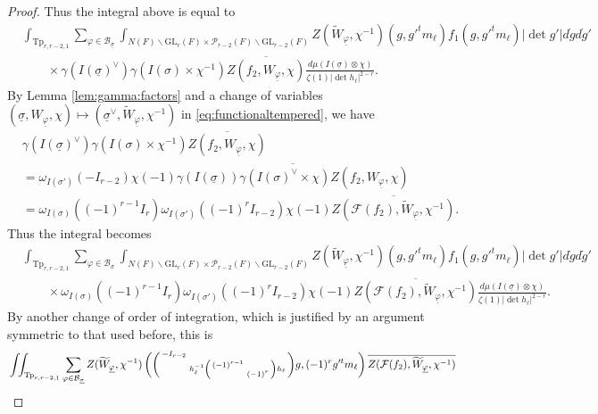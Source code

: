 \documentclass[12pt]{amsart}
\theoremstyle{remark}
\numberwithin{equation}{section}
\newcommand{\GL}{\mathrm{GL}}
\theoremstyle{definition}
\newenvironment{psmatrix}
  {\left(\begin{smallmatrix}}
  {\end{smallmatrix}\right)}
\numberwithin{equation}{subsection}
\begin{document}
\begin{proof}
Thus the integral above is equal to 
\begin{align*}
    &\int_{\mathrm{Tp}_{r,r-2,1}} \sum_{\varphi \in \mathcal{B}_{\underline{\sigma}}}\int_{N(F)\backslash\GL_r(F)\times \mathcal{P}_{r-2}(F)\backslash \GL_{r-2}(F)}Z(\widetilde{W}_{\underline{\varphi}},\chi^{-1})(g,g'^tm_{\ell})f_1(g,g'^tm_{\ell})|\det g'|d\dot{g}d\dot{g}'\\& \quad\quad\times \gamma(I(\underline{\sigma})^\vee)\gamma(I(\sigma) \times \chi^{-1})\overline{Z(f_2,W_{\underline{\varphi}},\chi)}\frac{d\mu(I(\underline{\sigma})\otimes\chi)}{\zeta(1)|\det h_\ell|^{2-r}}.
\end{align*}
By Lemma \ref{lem:gamma:factors} and a change of variables $(\underline{\sigma},W_{\underline{\varphi}},\chi) \mapsto (\underline{\sigma}^\vee,\widetilde{W}_{\underline{\varphi}},\chi^{-1})$ in    \eqref{eq:functionaltempered}, we have
\begin{align*}
     &\gamma( I(\underline{\sigma})^\vee )\gamma(
    I(\sigma) \times \chi^{-1})\overline{Z(f_2,W_{\underline{\varphi}},\chi)}\\
    &=\omega_{I(\sigma')}(-I_{r-2})\chi(-1)\overline{\gamma( I(\underline{\sigma}) )\gamma(
    I(\sigma)^\vee \times \chi)Z(f_2,W_{\underline{\varphi}},\chi)}\\
    &=\omega_{I(\sigma)}((-1)^{r-1}I_{r})\omega_{I(\sigma')}((-1)^{r}I_{r-2})\chi(-1)\overline{Z(\mathcal{F}(f_2),\widetilde{W}_{\underline{\varphi}},\chi^{-1})}.
\end{align*}
Thus the integral becomes 
\begin{align*}
    &\int_{\mathrm{Tp}_{r,r-2,1}} \sum_{\varphi \in \mathcal{B}_{\underline{\sigma}}}\int_{N(F)\backslash\GL_r(F)\times \mathcal{P}_{r-2}(F)\backslash \GL_{r-2}(F)}Z(\widetilde{W}_{\underline{\varphi}},\chi^{-1})(g,g'^tm_{\ell})f_1(g,g'^tm_{\ell})|\det g'|d\dot{g}d\dot{g}'\\& \quad\quad\times \omega_{I(\sigma)}((-1)^{r-1}I_{r})\omega_{I(\sigma')}((-1)^{r}I_{r-2})\chi(-1)\overline{Z(\mathcal{F}(f_2),\widetilde{W}_{\underline{\varphi}},\chi^{-1})}\frac{d\mu(I(\underline{\sigma})\otimes\chi)}{\zeta(1)|\det h_\ell|^{2-r}}.
\end{align*}    
By another change of order of integration, which is justified by an argument symmetric to that used before, this is
\begin{align*}
     &\int_{}\int_{\mathrm{Tp}_{r,r-2,1}} \sum_{\varphi \in \mathcal{B}_{\underline{\sigma}}}Z(\widetilde{W}_{\underline{\varphi}},\chi^{-1})\left(\begin{psmatrix} -I_{r-2}& \\ & h_\ell^{-1} \begin{psmatrix} (-1)^{r-1} &\\ & (-1)^{r}\end{psmatrix} h_\ell  \end{psmatrix}g,(-1)^{r}g'^tm_{\ell}\right)\overline{Z(\mathcal{F}(f_2),\widetilde{W}_{\underline{\varphi}},\chi^{-1})}\\

\end{align*}
\end{proof}
\end{document}
